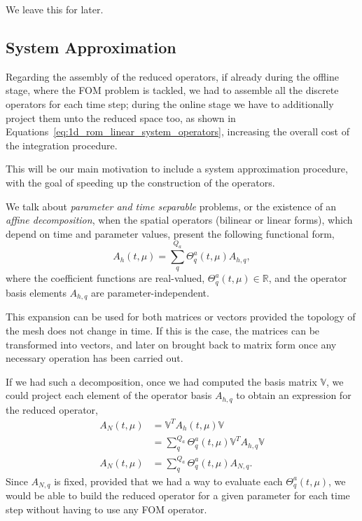 \documentclass[../../1_heat_equation.tex]{subfiles}
\newcommand{\rbV}{\ensuremath{\mathbb{V}}}
\newcommand{\rbVT}{\ensuremath{\rbV^T}}
\begin{document}
We leave this for later.

\subsection{System Approximation}
\label{sec:1d_rom_heat_equation_system_approximation_deim}
Regarding the assembly of the reduced operators, if already during the offline stage, where the FOM problem is tackled, we had to assemble all the discrete operators for each time step;
during the online stage we have to additionally project them unto the reduced space too, as shown in Equations~\eqref{eq:1d_rom_linear_system_operators},
increasing the overall cost of the integration procedure.

This will be our main motivation to include a system approximation procedure,
with the goal of speeding up the construction of the operators.

We talk about \emph{parameter and time separable} problems, or the existence of an \emph{affine decomposition},
when the spatial operators (bilinear or linear forms), which depend on time and parameter values, present the following functional form,
\begin{equation}
    \label{eq:1d_rom_heat_equation_separable_form_time_param}
    A_h(t, \mu) = \sum_q^{Q_a} \Theta_q^a(t, \mu) A_{h,q},
\end{equation}
where the coefficient functions are real-valued, \mbox{$\Theta_q^a(t, \mu) \in \mathbb{R}$}, and the operator basis elements $A_{h,q}$ are parameter-independent.

This expansion can be used for both matrices or vectors provided the topology of the mesh does not change in time.
If this is the case, the matrices can be transformed into vectors, and later on brought back to matrix form once any necessary operation has been carried out.

If we had such a decomposition, once we had computed the basis matrix \rbV, we could project each element of the operator basis $A_{h, q}$ to obtain an expression for the reduced operator, 
\begin{equation}
    \begin{split}
        A_N(t, \mu) &= \rbVT A_h(t, \mu) \rbV \\ 
        &= \sum_q^{Q_a} \Theta_q^a(t, \mu) \rbVT  A_{h, q} \rbV \\
        A_N(t, \mu) &= \sum_q^{Q_a} \Theta_q^a(t, \mu) A_{N,q}.
    \end{split}
\end{equation}
Since $A_{N, q}$ is fixed, provided that we had a way to evaluate each $\Theta_q^a(t, \mu)$, we would be able to build the reduced operator for a given parameter for each time step without having to use any FOM operator. 
\end{document}
